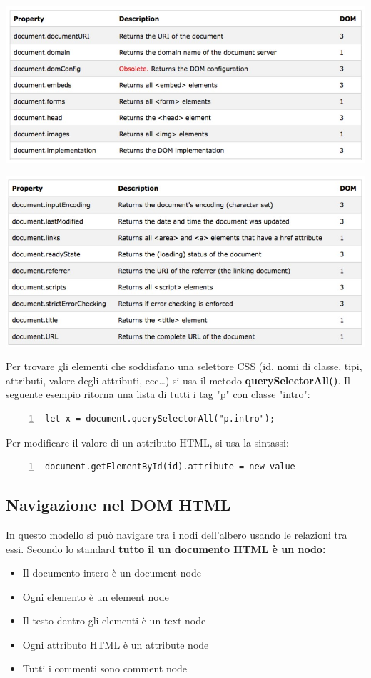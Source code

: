 \begin{center}
    \includegraphics[scale=0.4]{Images/TecnologieWeb/8/PerTrovareOggetti2.jpg}
\end{center}
\begin{center}
    \includegraphics[scale=0.4]{Images/TecnologieWeb/8/PerTrovareOggetti3.jpg}
\end{center}
Per trovare gli elementi che soddisfano una selettore CSS (id, nomi di classe, tipi, attributi, valore degli attributi, ecc\dots) si usa il metodo \textbf{querySelectorAll()}. Il seguente esempio ritorna una lista di tutti i tag "p" con classe "intro":
\begin{Verbatim}[numbers=left, frame=single]
let x = document.querySelectorAll("p.intro");
\end{Verbatim}
Per modificare il valore di un attributo HTML, si usa la sintassi:
\begin{Verbatim}[numbers=left, frame=single]
document.getElementById(id).attribute = new value
\end{Verbatim}

\subsection{Navigazione nel DOM HTML}
In questo modello si può navigare tra i nodi dell'albero usando le relazioni tra essi. Secondo lo standard \textbf{tutto il un documento HTML è un nodo:}
\begin{itemize}
    \item Il documento intero è un document node
    \item Ogni elemento è un element node
    \item Il testo dentro gli elementi è un text node
    \item Ogni attributo HTML è un attribute node
    \item Tutti i commenti sono comment node
\end{itemize}


